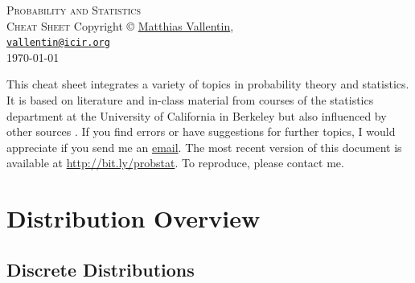 \documentclass[landscape]{article}
\makeatletter
\def\email{\texttt{\href{mailto:vallentin@icir.org}{vallentin@icir.org}}}
\def\web{\url{http://bit.ly/probstat}}
\makeatother
\begin{document}
\thispagestyle{empty}
\begin{center}
  \vspace*{\fill}
  \textsc{\Huge Probability and Statistics\\[2ex] \huge Cheat Sheet}
  \vfill
  \footnotesize{
  Copyright \copyright{} 
  \href{http://matthias.vallentin.net}{Matthias Vallentin}, \number\year\\
    \email\\[2ex]
    \today
  }
\end{center}

\newpage

\thispagestyle{empty}
\begin{multicols*}{3}
  {\footnotesize
  This cheat sheet integrates a variety of topics in probability theory and
  statistics. It is based on literature \cite{Hoel72,Wasserman03,Shumway06} and
  in-class material from courses of the statistics department at the University
  of California in Berkeley but also influenced by other sources
  \cite{Steger01,Steger02}. If you find errors or have suggestions for further
  topics, I would appreciate if you send me an
  \href{mailto:vallentin@icir.org}{email}. The most recent version of this
  document is available at \web. To reproduce, please contact me.}
  \tableofcontents

\end{multicols*}
\newpage

\section{Distribution Overview}

\subsection{Discrete Distributions}
\end{document}
